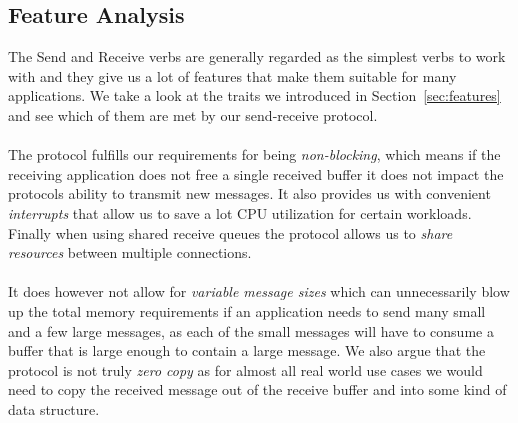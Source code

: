 \subsection{Feature Analysis}

The Send and Receive verbs are generally regarded as the simplest verbs to work with and they give us a lot of features
that make them suitable for many applications. We take a look at the traits we introduced in Section~\ref{sec:features} 
and see which of them are met by our send-receive protocol.

\paragraph{} The protocol fulfills our requirements for being \emph{non-blocking}, which means if the receiving application does not free a single
received buffer it does not impact the protocols ability to transmit new messages.
It also provides us with convenient \emph{interrupts} that allow us to save a lot CPU utilization for certain workloads.
Finally when using shared receive queues the protocol allows us to \emph{share resources} between multiple connections.

\paragraph{} It does however not allow for \emph{variable message sizes} which can unnecessarily blow up the total memory
requirements if an application needs to send many small and a few large messages, as each of the small messages will have
to consume a buffer that is large enough to contain a large message. We also argue that the protocol is not truly 
\emph{zero copy} as for almost all real world use cases we would need to copy the received message out of the
receive buffer and into some kind of data structure.


